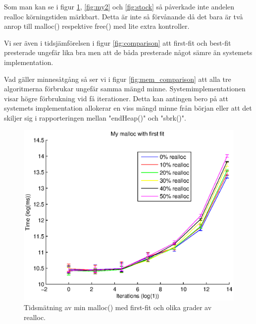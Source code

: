 \documentclass[10pt,a4paper]{article}
\begin{document}
Som man kan se i figur \ref{fig:my1}, \ref{fig:my2} och \ref{fig:stock} så påverkade inte andelen realloc körningstiden märkbart. Detta är inte så förvånande då det bara är två anrop till malloc() respektive free() med lite extra kontroller.

Vi ser även i tidsjämförelsen i figur \ref{fig:comparison} att first-fit och best-fit presterade ungefär lika bra men att de båda presterade något sämre än systemets implementation.

Vad gäller minnesåtgång så ser vi i figur \ref{fig:mem_comparison} att alla tre algoritmerna förbrukar ungefär samma mängd minne. Systemimplementationen visar högre förbrukning vid få iterationer. Detta kan antingen bero på att systemets implementation allokerar en viss mängd minne från början eller att det skiljer sig i rapporteringen mellan "endHeap()" och "sbrk()".

\clearpage

\begin{figure}
\includegraphics[scale=0.7]{../results/my1.eps}
\caption{Tidsmätning av min malloc() med first-fit och olika grader av realloc.}
\label{fig:my1}
\end{figure}
\end{document}
